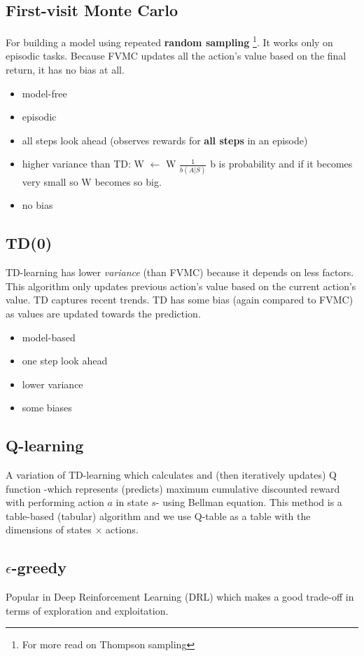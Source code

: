 \documentclass[letterpaper,12pt]{article}
\begin{document}
\subsection{First-visit Monte Carlo}
For building a model using repeated \textbf{random sampling} \footnote{For more read on Thompson sampling}. It works only on episodic tasks. Because FVMC updates all the action's value based on the final return, it has no bias at all.
\begin{itemize}
    \item model-free
    \item episodic
    \item  all steps look ahead (observes rewards for \textbf{all steps} in an episode)
    \item higher variance than TD: W $\leftarrow$ W $\frac{1}{b(A|S)}$ b is probability and if it becomes very small so W becomes so big.
    \item no bias
\end{itemize}

\subsection{TD(0)}
TD-learning has lower \textit{variance} (than FVMC) because it depends on less factors. This algorithm only updates previous action's value based on the current action's value. TD captures recent trends. TD has some bias (again compared to FVMC) as values are updated towards the prediction.
\begin{itemize}
    \item model-based
    \item one step look ahead
    \item lower variance
    \item some biases
\end{itemize}

\subsection{Q-learning}
A variation of TD-learning which calculates and (then iteratively updates) Q function -which represents (predicts) maximum cumulative discounted reward with performing action $a$ in state $s$- using Bellman equation. This method is a table-based (tabular) algorithm and we use Q-table as a table with the dimensions of states $\times$ actions.

\subsection{$\epsilon$-greedy}
Popular in Deep Reinforcement Learning (DRL) which makes a good trade-off in terms of exploration and exploitation.
\end{document}
